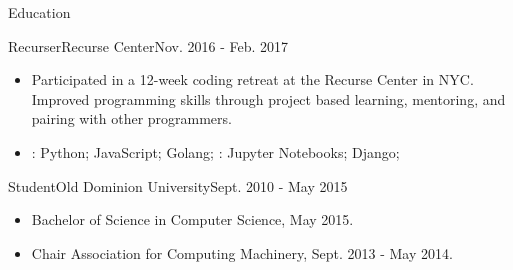 \documentclass[]{mcdowellcv}
\begin{document}
    \begin{cvsection}{Education}
        \begin{cvsubsection}{Recurser}{Recurse Center}{Nov. 2016 - Feb. 2017}
            \begin{itemize}
                \item Participated in a 12-week coding retreat at the Recurse Center in NYC.\newline 
                Improved programming skills through project based learning, mentoring, and pairing with other programmers.
            \end{itemize}
            \begin{itemize}
                 \item {}: Python; JavaScript; Golang; : Jupyter Notebooks; Django;
            \end{itemize}
        \end{cvsubsection}
        \begin{cvsubsection}{Student}{Old Dominion University}{Sept. 2010 - May 2015}
            \begin{itemize}
                \item Bachelor of Science in Computer Science, May 2015.
                \item Chair Association for Computing Machinery, Sept. 2013 - May 2014.
            \end{itemize}
        \end{cvsubsection}
    \end{cvsection}
\end{document}
